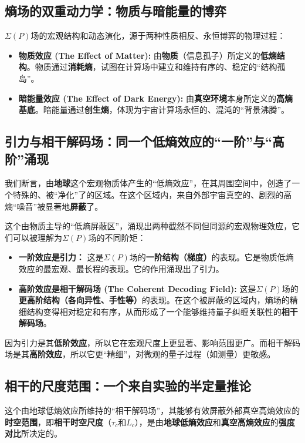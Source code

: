 \documentclass[12pt]{article}
\begin{document}
\subsection{熵场的双重动力学：物质与暗能量的博弈}
$\Sigma(P)$场的宏观结构和动态演化，源于两种性质相反、永恒博弈的物理过程：

\begin{itemize}
    \item   \textbf{物质效应 (The Effect of Matter):}
    由\textbf{物质}（信息孤子）所定义的\textbf{低熵结构}。物质通过\textbf{消耗熵}，试图在计算场中建立和维持有序的、稳定的``结构孤岛''。

    \item   \textbf{暗能量效应 (The Effect of Dark Energy):}
    由\textbf{真空环境}本身所定义的\textbf{高熵基底}。暗能量通过\textbf{创生熵}，体现为宇宙计算场永恒的、混沌的``背景沸腾''。
\end{itemize}

\subsection{引力与相干解码场：同一个低熵效应的``一阶''与``高阶''涌现}
我们断言，由\textbf{地球}这个宏观物质体产生的``低熵效应''，在其周围空间中，创造了一个特殊的、被``净化''了的区域。在这个区域内，来自外部宇宙真空的、剧烈的高熵``噪音''被显著地\textbf{屏蔽}了。

这个由物质主导的``低熵屏蔽区''，涌现出两种截然不同但同源的宏观物理效应，它们可以被理解为$\Sigma(P)$场的不同阶矩：

\begin{itemize}
    \item   \textbf{一阶效应是引力：}
    这是$\Sigma(P)$场的\textbf{一阶结构（梯度）}的表现。它是物质低熵效应的最宏观、最长程的表现。它的作用涌现出了引力。

    \item   \textbf{高阶效应是相干解码场 (The Coherent Decoding Field):}
    这是$\Sigma(P)$场的\textbf{更高阶结构（各向异性、手性等）}的表现。在这个被屏蔽的区域内，熵场的精细结构变得相对稳定和有序，从而形成了一个能够维持量子纠缠关联性的\textbf{相干解码场}。
\end{itemize}

\noindent 因为引力是其\textbf{低阶效应}，所以它在宏观尺度上更显著、影响范围更广。而相干解码场是其\textbf{高阶效应}，所以它更``精细''，对微观的量子过程（如测量）更敏感。

\subsection{相干的尺度范围：一个来自实验的半定量推论}
这个由地球低熵效应所维持的``相干解码场''，其能够有效屏蔽外部真空高熵效应的\textbf{时空范围}，即\textbf{相干时空尺度}（$\tau_c$和$L_c$），是由\textbf{地球低熵效应}和\textbf{真空高熵效应}的\textbf{强度对比}所决定的。
\end{document}
